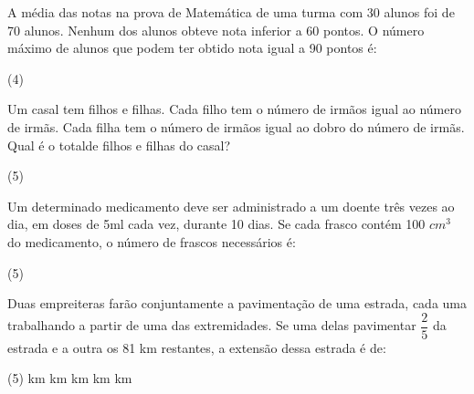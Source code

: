 \documentclass[a4paper,11pt,addpoints]{exam}
\begin{document}
\begin{questions}

	\question[2]

    A média das notas na prova de Matemática de uma turma com 30 alunos foi de
    70 alunos. Nenhum dos alunos obteve nota inferior a 60 pontos. O número
    máximo de alunos que podem ter obtido nota igual a 90 pontos é:

    \begin{tasks}(4)
    \end{tasks}

	\question[2]

    Um casal tem filhos e filhas. Cada filho tem o número de irmãos igual ao
    número de irmãs. Cada filha tem o número de irmãos igual ao dobro do número
    de irmãs. Qual é o totalde filhos e filhas do casal?

    \begin{tasks}(5)
    \end{tasks}

	\question[2]

    Um determinado medicamento deve ser administrado a um doente três vezes ao dia,
    em doses de 5ml cada vez, durante 10 dias. Se cada frasco contém 100 $cm^3$ do
    medicamento, o número de frascos necessários é:

    \begin{tasks}(5)
    \end{tasks}

    \question[2]

    Duas empreiteras farão conjuntamente a pavimentação de uma estrada, cada uma
    trabalhando a partir de uma das extremidades. Se uma delas pavimentar
    $\dfrac{2}{5}$ da estrada e a outra os 81 km restantes, a extensão dessa
    estrada é de:

    \begin{tasks}(5)
         km
         km
         km
         km
         km
    \end{tasks}


\end{questions}
\end{document}
